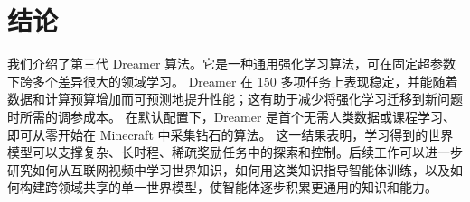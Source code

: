 \section*{结论}
\label{sec:discussion}

我们介绍了第三代 Dreamer 算法。它是一种通用强化学习算法，可在固定超参数下跨多个差异很大的领域学习。
Dreamer 在 150 多项任务上表现稳定，并能随着数据和计算预算增加而可预测地提升性能；这有助于减少将强化学习迁移到新问题时所需的调参成本。
在默认配置下，Dreamer 是首个无需人类数据或课程学习、即可从零开始在 Minecraft 中采集钻石的算法。
这一结果表明，学习得到的世界模型可以支撑复杂、长时程、稀疏奖励任务中的探索和控制。后续工作可以进一步研究如何从互联网视频中学习世界知识，如何用这类知识指导智能体训练，以及如何构建跨领域共享的单一世界模型，使智能体逐步积累更通用的知识和能力。
